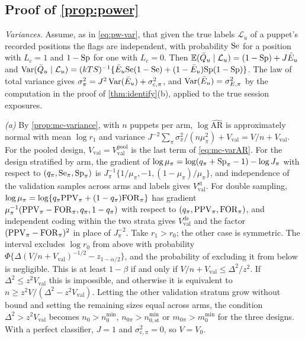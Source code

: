 \subsection{Proof of \texorpdfstring{\cref{prop:power}}{the power proposition}}\label{app:pf-power}

\emph{Variances.} Assume, as in \eqref{eq:pw-var}, that given the true labels $\mathcal L_u$ of a puppet's recorded positions the flags are independent, with probability $\mathrm{Se}$ for a position with $L_c=1$ and $1-\mathrm{Sp}$ for one with $L_c=0$. Then $\mathbb{E}(\bar Q_u\mid\mathcal L_u)=(1-\mathrm{Sp})+J\bar E_u$ and $\operatorname{Var}(\bar Q_u\mid\mathcal L_u)=(kTS)^{-1}\{\bar E_u\mathrm{Se}(1-\mathrm{Se})+(1-\bar E_u)\mathrm{Sp}(1-\mathrm{Sp})\}$. The law of total variance gives $\sigma^2_\pi=J^2\operatorname{Var}(\bar E_u)+\sigma^2_{\mathrm c,\pi}$, and $\operatorname{Var}(\bar E_u)=\sigma^2_{E,\pi}$ by the computation in the proof of \cref{thm:identify}(b), applied to the true session exposures.

\emph{(a)} By \cref{prop:mc-variance}, with $n$ puppets per arm, $\log\widehat{\mathrm{AR}}$ is approximately normal with mean $\log r_1$ and variance $J^{-2}\sum_\pi\sigma^2_\pi/(n\mu_\pi^2)+V_{\mathrm{val}}=V/n+V_{\mathrm{val}}$. For the pooled design, $V_{\mathrm{val}}=V_{\mathrm{val}}^{\mathrm{pool}}$ is the last term of \eqref{eq:mc-varAR}. For the design stratified by arm, the gradient of $\log\mu_\pi=\log(q_\pi+\mathrm{Sp}_\pi-1)-\log J_\pi$ with respect to $(q_\pi,\mathrm{Se}_\pi,\mathrm{Sp}_\pi)$ is $J_\pi^{-1}\{1/\mu_\pi,-1,(1-\mu_\pi)/\mu_\pi\}$, and independence of the validation samples across arms and labels gives $V_{\mathrm{val}}^{\mathrm{st}}$. For double sampling, $\log\mu_\pi=\log\{q_\pi\mathrm{PPV}_\pi+(1-q_\pi)\mathrm{FOR}_\pi\}$ has gradient $\mu_\pi^{-1}(\mathrm{PPV}_\pi-\mathrm{FOR}_\pi,q_\pi,1-q_\pi)$ with respect to $(q_\pi,\mathrm{PPV}_\pi,\mathrm{FOR}_\pi)$, and independent coding within the two strata gives $V_{\mathrm{val}}^{\mathrm{ds}}$ and the factor $(\mathrm{PPV}_\pi-\mathrm{FOR}_\pi)^2$ in place of $J_\pi^{-2}$. Take $r_1>r_0$; the other case is symmetric. The interval excludes $\log r_0$ from above with probability $\Phi\{\Delta(V/n+V_{\mathrm{val}})^{-1/2}-z_{1-\alpha/2}\}$, and the probability of excluding it from below is negligible. This is at least $1-\beta$ if and only if $V/n+V_{\mathrm{val}}\le\Delta^2/z^2$. If $\Delta^2\le z^2V_{\mathrm{val}}$ this is impossible, and otherwise it is equivalent to $n\ge z^2V/(\Delta^2-z^2V_{\mathrm{val}})$. Letting the other validation stratum grow without bound and setting the remaining sizes equal across arms, the condition $\Delta^2>z^2V_{\mathrm{val}}$ becomes $n_0>n_0^{\min}$, $n_{0\pi}>n^{\min}_{0,\mathrm{st}}$ or $m_{0\pi}>m_0^{\min}$ for the three designs. With a perfect classifier, $J=1$ and $\sigma^2_{\mathrm c,\pi}=0$, so $V=V_0$.

